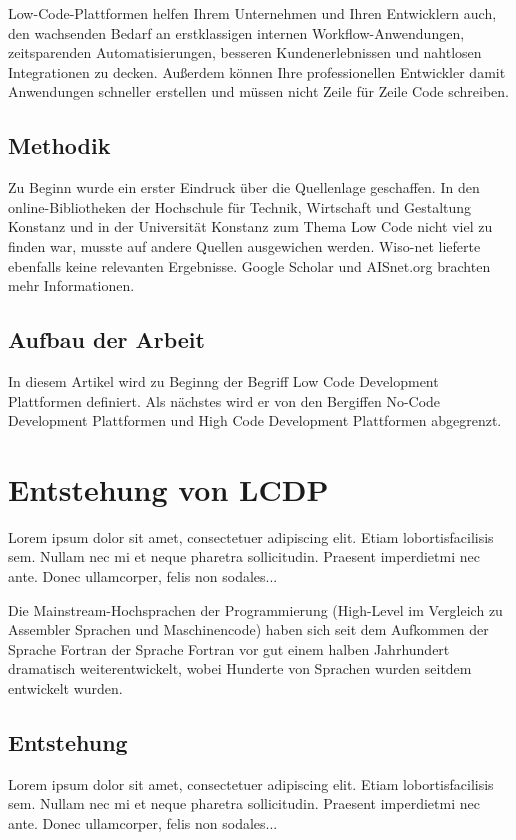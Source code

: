 \documentclass{article}
\begin{document}
	Low-Code-Plattformen helfen Ihrem Unternehmen und Ihren Entwicklern auch, den wachsenden Bedarf an erstklassigen internen Workflow-Anwendungen, zeitsparenden Automatisierungen, besseren Kundenerlebnissen und nahtlosen Integrationen zu decken. Außerdem können Ihre professionellen Entwickler damit Anwendungen schneller erstellen und müssen nicht Zeile für Zeile Code schreiben.
	
	\subsection{Methodik}
	Zu Beginn wurde ein erster Eindruck über die Quellenlage geschaffen. In den online-Bibliotheken der Hochschule für Technik, Wirtschaft und Gestaltung Konstanz und in der Universität Konstanz zum Thema Low Code nicht viel zu finden war, musste auf andere Quellen ausgewichen werden. \newline
	Wiso-net lieferte ebenfalls keine relevanten Ergebnisse. 
	Google Scholar und AISnet.org brachten mehr Informationen.
	
	
	\subsection{Aufbau der Arbeit}
	In diesem Artikel wird zu Beginng der Begriff Low Code Development Plattformen definiert. 
	Als nächstes wird er von den Bergiffen No-Code Development Plattformen und High Code Development Plattformen abgegrenzt. \newline
	
	
	\section{Entstehung von LCDP}
	Lorem  ipsum  dolor  sit  amet,  consectetuer  adipiscing  
	elit.   Etiam  lobortisfacilisis sem.  Nullam nec mi et 
	neque pharetra sollicitudin.  Praesent imperdietmi nec ante. 
	Donec ullamcorper, felis non sodales...
	
	Die Mainstream-Hochsprachen der Programmierung (High-Level im Vergleich zu Assembler Sprachen und Maschinencode) haben sich seit dem Aufkommen der Sprache Fortran der Sprache Fortran vor gut einem halben Jahrhundert dramatisch weiterentwickelt, wobei Hunderte von Sprachen wurden seitdem entwickelt wurden.\cite{Margaria.2021}
	
	\subsection{Entstehung}	
	Lorem  ipsum  dolor  sit  amet,  consectetuer  adipiscing  
	elit.   Etiam  lobortisfacilisis sem.  Nullam nec mi et 
	neque pharetra sollicitudin.  Praesent imperdietmi nec ante. 
	Donec ullamcorper, felis non sodales...
	
\end{document}
